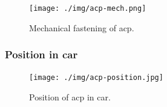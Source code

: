 \begin{figure}[H]
	\centering
	\texttt{[image: ./img/acp-mech.png]}
	\caption{Mechanical fastening of \gls{acp}.}
	\label{fig:acp-mech}
\end{figure}

\subsubsection{Position in car}

\begin{figure}[H]
	\centering
	\texttt{[image: ./img/acp-position.jpg]}
	\caption{Position of \gls{acp} in car.}
	\label{fig:ACP-position}
\end{figure}

